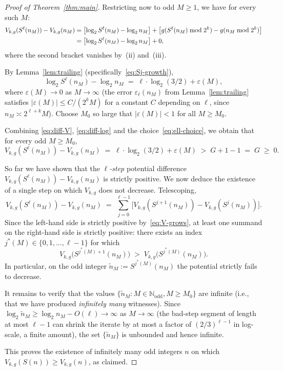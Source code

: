 \documentclass[11pt,a4paper]{article}
\theoremstyle{definition}
\theoremstyle{remark}
\newcommand{\N}{\mathbb{N}}
\newcommand{\Nodd}{\N_{\mathrm{odd}}}
\begin{document}
\begin{proof}[Proof of Theorem~\ref{thm:main}]
\medskip
Restricting now to odd $M \geq 1$, we have for every such $M$:
\begin{align}
  V_{k, g}(S^\ell(n_M)) - V_{k, g}(n_M)
  &= \bigl[\log_2 S^\ell(n_M) - \log_2 n_M\bigr]
   + \bigl[g(S^\ell(n_M) \bmod 2^k) - g(n_M \bmod 2^k)\bigr]
   \notag \\
  &= \bigl[\log_2 S^\ell(n_M) - \log_2 n_M\bigr]
   + 0,
   \label{eq:diff-V}
\end{align}
where the second bracket vanishes by~(ii) and~(iii).

By Lemma~\ref{lem:trailing} (specifically~\eqref{eq:Sj-growth}),
\begin{equation}\label{eq:diff-log}
  \log_2 S^\ell(n_M) - \log_2 n_M
  \;=\; \ell \cdot \log_2(3/2) + \varepsilon(M),
\end{equation}
where $\varepsilon(M) \to 0$ as $M \to \infty$ (the error
$\varepsilon_\ell(n_M)$ from Lemma~\ref{lem:trailing} satisfies
$|\varepsilon(M)| \leq C / (2^k M)$ for a constant $C$ depending on
$\ell$, since $n_M \asymp 2^{\ell + k} M$).  Choose $M_0$ so large that
$|\varepsilon(M)| < 1$ for all $M \geq M_0$.

Combining \eqref{eq:diff-V}, \eqref{eq:diff-log} and the
choice~\eqref{eq:ell-choice}, we obtain that for every odd $M \geq M_0$,
\begin{equation}\label{eq:V-grows}
  V_{k, g}(S^\ell(n_M)) - V_{k, g}(n_M)
  \;=\; \ell \cdot \log_2(3/2) + \varepsilon(M)
  \;>\; G + 1 - 1 \;=\; G \;\geq\; 0.
\end{equation}

So far we have shown that the \emph{$\ell$-step} potential difference
$V_{k, g}(S^\ell(n_M)) - V_{k, g}(n_M)$ is strictly positive.  We now
deduce the existence of a single step on which $V_{k, g}$ does not
decrease.  Telescoping,
\[
  V_{k, g}(S^\ell(n_M)) - V_{k, g}(n_M)
  \;=\; \sum_{j = 0}^{\ell - 1}
    \bigl[V_{k, g}(S^{j+1}(n_M)) - V_{k, g}(S^j(n_M))\bigr].
\]
Since the left-hand side is strictly positive by~\eqref{eq:V-grows},
at least one summand on the right-hand side is strictly positive: there
exists an index $j^*(M) \in \{0, 1, \dots, \ell - 1\}$ for which
\[
  V_{k, g}\bigl(S^{j^*(M) + 1}(n_M)\bigr) \;>\;
  V_{k, g}\bigl(S^{j^*(M)}(n_M)\bigr).
\]
In particular, on the odd integer $\tilde n_M := S^{j^*(M)}(n_M)$ the
potential strictly fails to decrease.

It remains to verify that the values $\{\tilde n_M : M \in \Nodd,
M \geq M_0\}$ are infinite (i.e., that we have produced
\emph{infinitely many} witnesses).  Since
$\log_2 \tilde n_M \geq \log_2 n_M - O(\ell) \to \infty$ as
$M \to \infty$ (the bad-step segment of length at most $\ell - 1$ can
shrink the iterate by at most a factor of $(2/3)^{\ell - 1}$ in
log-scale, a finite amount), the set $\{\tilde n_M\}$ is unbounded and
hence infinite.

This proves the existence of infinitely many odd integers $n$ on which
$V_{k, g}(S(n)) \geq V_{k, g}(n)$, as claimed.
\end{proof}
\end{document}

